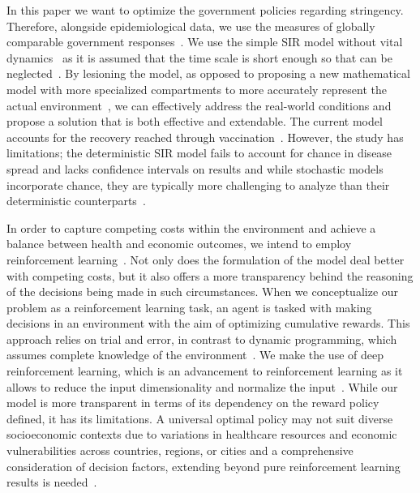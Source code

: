 \documentclass[tikz,fleqn,12pt]{wlscirep}
\begin{document}
In this paper we want to optimize the government policies regarding stringency. Therefore, alongside epidemiological data, we use the measures of globally comparable government responses~\cite{Hale2021}. We use the simple SIR model without vital dynamics~\cite{Hethcote1989, Hethcote2008, ALLEN2017128} as it is assumed that the time scale is short enough so that can be neglected~\cite{Cooper2020}. By lesioning the model, as opposed to proposing a new mathematical model with more specialized compartments to more accurately represent the actual environment~\cite{Bjrnstad2020, Mwalili2020}, we can effectively address the real-world conditions and propose a solution that is both effective and extendable. The current model accounts for the recovery reached through vaccination~\cite{Marinov2022, MaurciodeCarvalho2023, Thater, Turkyilmazoglu2022, YALADANDA2022101052}. However, the study has limitations; the deterministic SIR model fails to account for chance in disease spread and lacks confidence intervals on results and while stochastic models incorporate chance, they are typically more challenging to analyze than their deterministic counterparts~\cite{Hethcote2008}.

In order to capture competing costs within the environment and achieve a balance between health and economic outcomes, we intend to employ reinforcement learning~\cite{Nguyen2022, Bastani2021, Song2022, Ohi2020, PADMANABHAN2021102676}. Not only does the formulation of the model deal better with competing costs, but it also offers a more transparency behind the reasoning of the decisions being made in such circumstances. When we conceptualize our problem as a reinforcement learning task, an agent is tasked with making decisions in an environment with the aim of optimizing cumulative rewards. This approach relies on trial and error, in contrast to dynamic programming, which assumes complete knowledge of the environment~\cite{Lavet2018}. We make the use of deep reinforcement learning, which is an advancement to reinforcement learning as it allows to reduce the input dimensionality and normalize the input~\cite{Lavet2018, Arulkumaran2017, Henderson_Islam_Bachman_Pineau_Precup_Meger_2018, Mnih2015}. While our model is more transparent in terms of its dependency on the reward policy defined, it has its limitations. A universal optimal policy may not suit diverse socioeconomic contexts due to variations in healthcare resources and economic vulnerabilities across countries, regions, or cities and a comprehensive consideration of decision factors, extending beyond pure reinforcement learning results is needed~\cite{Song2022, Dunn2017, Demir2006}.
\end{document}
